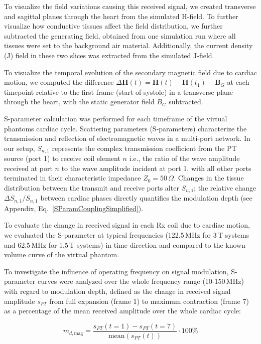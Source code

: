 \documentclass[
]{article}
\begin{document}
To visualize the field variations causing this received signal, we
created transverse and sagittal planes through the heart from the
simulated H-field. To further visualize how conductive tissues affect
the field distribution, we further subtracted the generating field,
obtained from one simulation run where all tissues were set to the
background air material. Additionally, the current density (J) field in
these two slices was extracted from the simulated J-field.

To visualize the temporal evolution of the secondary magnetic field due to cardiac motion, we computed the difference $\Delta\mathbf{H}(t) = \mathbf{H}(t) - \mathbf{H}(t_1) - \mathbf{B}_G$ at each timepoint relative to the first frame (start of systole) in a transverse plane through the heart, with the static generator field $B_G$ subtracted.

S-parameter calculation was performed for each timeframe of the virtual
phantoms cardiac cycle. Scattering parameters (S-parameters) characterize the transmission and reflection of electromagnetic waves in a multi-port network. In our setup, $S_{n,1}$ represents the complex transmission coefficient from the PT source (port 1) to receive coil element $n$ i.e., the ratio of the wave amplitude received at port $n$ to the wave amplitude incident at port 1, with all other ports terminated in their characteristic impedance $Z_0 = 50\,\Omega$. Changes in the tissue distribution between the transmit and receive ports alter $S_{n,1}$; the relative change $\Delta S_{n,1}/S_{n,1}$ between cardiac phases directly quantifies the modulation depth (see Appendix, Eq.~\ref{SParamCouplingSimplified}).

To evaluate the change in received signal in
each Rx coil due to cardiac motion, we evaluated the S-parameter at
typical frequencies (122.5\,MHz for 3\,T systems and 62.5\,MHz for 1.5\,T
systems) in time direction and compared to the known volume curve of the
virtual phantom.

To investigate the influence of operating frequency on signal
modulation, S-parameter curves were analyzed over the whole frequency
range (10-150\,MHz) with regard to modulation depth, defined as the change
in received signal amplitude $s_{PT}$ from full expansion (frame 1) to
maximum contraction (frame 7) as a percentage of the mean received
amplitude over the whole cardiac cycle:

\begin{equation}
\label{eq:mod-depth-mag}
m_{d,\mathrm{mag}} = \frac{s_{PT}(t = 1) - s_{PT}(t = 7)}{\mathrm{mean}\!\left(s_{PT}(t)\right)} \cdot 100\%
\end{equation}
\end{document}
